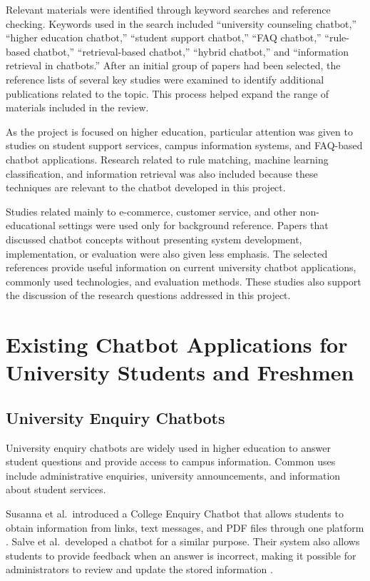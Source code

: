 \documentclass[12pt,a4paper]{article}
\begin{document}
Relevant materials were identified through keyword searches and reference checking. Keywords used in the search included “university counseling chatbot,” “higher education chatbot,” “student support chatbot,” “FAQ chatbot,” “rule-based chatbot,” “retrieval-based chatbot,” “hybrid chatbot,” and “information retrieval in chatbots.” After an initial group of papers had been selected, the reference lists of several key studies were examined to identify additional publications related to the topic. This process helped expand the range of materials included in the review.

As the project is focused on higher education, particular attention was given to studies on student support services, campus information systems, and FAQ-based chatbot applications. Research related to rule matching, machine learning classification, and information retrieval was also included because these techniques are relevant to the chatbot developed in this project.

Studies related mainly to e-commerce, customer service, and other non-educational settings were used only for background reference. Papers that discussed chatbot concepts without presenting system development, implementation, or evaluation were also given less emphasis. The selected references provide useful information on current university chatbot applications, commonly used technologies, and evaluation methods. These studies also support the discussion of the research questions addressed in this project.
\section{Existing Chatbot Applications for University Students and Freshmen}

\subsection{University Enquiry Chatbots}

University enquiry chatbots are widely used in higher education to answer student questions and provide access to campus information. Common uses include administrative enquiries, university announcements, and information about student services.

Susanna et al.\ introduced a College Enquiry Chatbot that allows students to obtain information from links, text messages, and PDF files through one platform \cite{susanna2020}. Salve et al.\ developed a chatbot for a similar purpose. Their system also allows students to provide feedback when an answer is incorrect, making it possible for administrators to review and update the stored information \cite{salve}.
\end{document}
